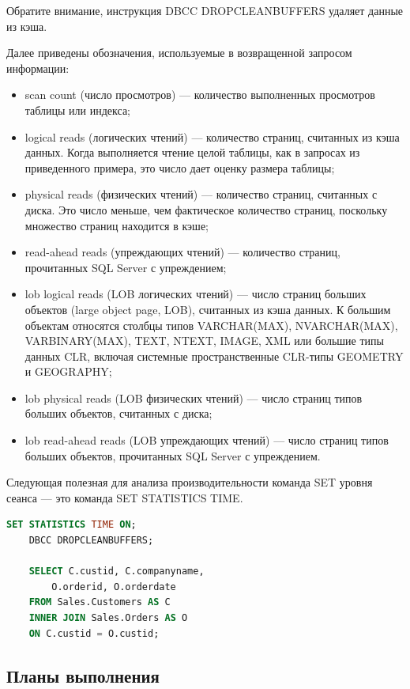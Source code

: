 Обратите внимание, инструкция DBCC DROPCLEANBUFFERS удаляет данные из кэша. 

Далее приведены обозначения, используемые в возвращенной запросом информации: 

\begin{itemize}
	\item scan count (число просмотров) — количество выполненных просмотров таблицы или индекса; 
	\item logical reads (логических чтений) — количество страниц, считанных из кэша
	данных. Когда выполняется чтение целой таблицы, как в запросах из приведенного примера, это число дает оценку размера таблицы; 
	\item physical reads (физических чтений) — количество страниц, считанных с диска.
	Это число меньше, чем фактическое количество страниц, поскольку множество
	страниц находится в кэше;
	\item read-ahead reads (упреждающих чтений) — количество страниц, прочитанных
	SQL Server с упреждением; 
	\item lob logical reads (LOB логических чтений) — число страниц больших объектов
	(large object page, LOB), считанных из кэша данных. К большим объектам относятся столбцы типов VARCHAR(MAX), NVARCHAR(MAX), VARBINARY(MAX), TEXT, NTEXT,
	IMAGE, XML или большие типы данных CLR, включая системные пространственные CLR-типы GEOMETRY и GEOGRAPHY; 
	\item lob physical reads (LOB физических чтений) — число страниц типов больших
	объектов, считанных с диска; 
	\item lob read-ahead reads (LOB упреждающих чтений) — число страниц типов
	больших объектов, прочитанных SQL Server с упреждением. 
\end{itemize}


Следующая полезная для анализа производительности команда SET уровня сеанса — это команда SET STATISTICS TIME.

\begin{lstlisting}[label=lst:funcReturn, language=sql]
	SET STATISTICS TIME ON;
	DBCC DROPCLEANBUFFERS;

	SELECT C.custid, C.companyname,
 		O.orderid, O.orderdate
	FROM Sales.Customers AS C
 	INNER JOIN Sales.Orders AS O
 	ON C.custid = O.custid; 
\end{lstlisting}

\subsection{Планы выполнения}

